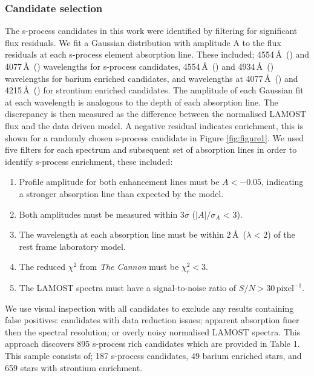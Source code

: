 \documentclass[a4paper,fleqn,usenatbib]{mnras}
\begin{document}
\subsubsection{Candidate selection} \label{sec:cand}
The s-process candidates in this work were identified by filtering for significant flux residuals. We fit a Gaussian distribution with amplitude A to the flux residuals at each s-process element absorption line. These included; 4554\,\AA\ () and 4077\,\AA\ () wavelengths for s-process candidates, 4554\,\AA\ () and 4934\,\AA\ () wavelengths for barium enriched candidates, and wavelengths at 4077\,\AA\ () and 4215\,\AA\ () for strontium enriched candidates. The amplitude of each Gaussian fit at each wavelength is analogous to the depth of each absorption line. The discrepancy is then measured as the difference between the normalised LAMOST flux and the data driven model. A negative residual indicates enrichment, this is shown for a randomly chosen s-process candidate in Figure \ref{fig:figure1}.
We used five filters for each spectrum and subsequent set of absorption lines in order to identify s-process enrichment, these included:

\renewcommand\labelenumi{(\roman{enumi})}
\renewcommand\theenumi\labelenumi

\begin{enumerate} 
\item Profile amplitude for both enhancement lines must be $A < -0.05$, indicating a stronger absorption line than expected by the model.
\item Both amplitudes must be measured within 3$\sigma$ ($|A|/\sigma _A$ < 3).
\item The wavelength at each absorption line must be within 2\,\AA\ ($\lambda$ < 2) of the rest frame laboratory model.
\item The reduced $\chi^2$ from \emph{The Cannon} must be $\chi_r^2 < 3$.
\item The LAMOST spectra must have a signal-to-noise ratio of $S/N > 30\,\textrm{pixel}^{-1}$.
\end{enumerate}
We use visual inspection with all candidates to exclude any results containing false positives: candidates with data reduction issues; apparent absorption finer then the spectral resolution; or overly noisy normalised LAMOST spectra. This approach discovers 895 s-process rich candidates which are provided in Table 1. This sample consists of; 187 s-process candidates, 49 barium enriched stars, and 659 stars with strontium enrichment. 
\end{document}
